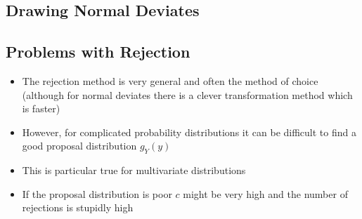 
\begin{slide}
\section{Drawing Normal Deviates}

\pause
\pb
{}
\begin{center}
  \pause
\end{center}

\end{slide}


\begin{slide}
\section{Problems with Rejection}

\begin{PauseHighLight}
  \begin{itemize}
  \item The rejection method is very general and often the method of
    choice (although for normal deviates there is a clever
    transformation method which is faster)\pause
  \item However, for complicated probability distributions it can be
    difficult to find a good proposal distribution $g_Y(y)$\pause
  \item This is particular true for multivariate distributions\pause
  \item If the proposal distribution is poor $c$ might be very high and
    the number of rejections is stupidly high\pause
  \end{itemize}
\end{PauseHighLight}

\end{slide}

\Outline %

